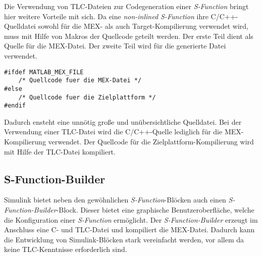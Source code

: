 Die Verwendung von TLC-Dateien zur Codegeneration einer \textit{S-Function} bringt hier weitere Vorteile mit sich. Da eine \textit{non-inlined S-Function} ihre C/C++-Quelldatei sowohl für die MEX- als auch Target-Kompilierung verwendet wird, muss mit Hilfe von Makros der Quellcode geteilt werden. Der erste Teil dient als Quelle für die MEX-Datei. Der zweite Teil wird für die generierte Datei verwendet.

\begin{lstlisting}
#ifdef MATLAB_MEX_FILE
	/* Quellcode fuer die MEX-Datei */
#else
	/* Quellcode fuer die Zielplattform */
#endif
\end{lstlisting}

Dadurch ensteht eine unnötig große und unübersichtliche Quelldatei. Bei der Verwendung einer TLC-Datei wird die C/C++-Quelle lediglich für die MEX-Kompilierung verwendet. Der Quellcode für die Zielplattform-Kompilierung wird mit Hilfe der TLC-Datei kompiliert.

\subsection{S-Function-Builder}
Simulink bietet neben den gewöhnlichen \textit{S-Function}-Blöcken auch einen \textit{S-Function-Builder}-Block. Dieser bietet eine graphische Benutzeroberfläche, welche die Konfiguration einer \textit{S-Function} ermöglicht. Der \textit{S-Function-Builder} erzeugt im Anschluss eine C- und TLC-Datei und kompiliert die MEX-Datei. Dadurch kann die Entwicklung von Simulink-Blöcken stark vereinfacht werden, vor allem da keine TLC-Kenntnisse erforderlich sind.